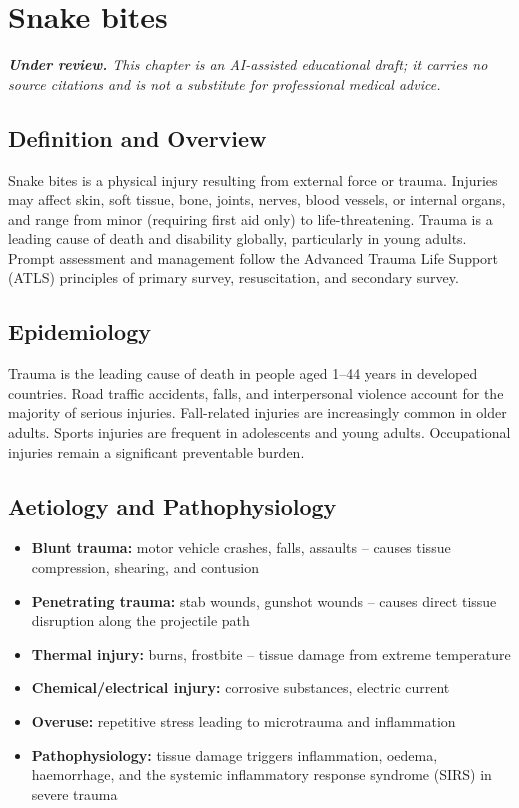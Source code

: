 \chapter{Snake bites}

\medskip
\noindent\textit{\textbf{Under review.} This chapter is an AI-assisted educational draft; it carries no source citations and is not a substitute for professional medical advice.}

\section*{Definition and Overview}
Snake bites is a physical injury resulting from external force or trauma. Injuries may affect skin, soft tissue, bone, joints, nerves, blood vessels, or internal organs, and range from minor (requiring first aid only) to life-threatening. Trauma is a leading cause of death and disability globally, particularly in young adults. Prompt assessment and management follow the Advanced Trauma Life Support (ATLS) principles of primary survey, resuscitation, and secondary survey.

\section*{Epidemiology}
Trauma is the leading cause of death in people aged 1--44 years in developed countries. Road traffic accidents, falls, and interpersonal violence account for the majority of serious injuries. Fall-related injuries are increasingly common in older adults. Sports injuries are frequent in adolescents and young adults. Occupational injuries remain a significant preventable burden.

\section*{Aetiology and Pathophysiology}
\begin{itemize}
    \item \textbf{Blunt trauma:} motor vehicle crashes, falls, assaults -- causes tissue compression, shearing, and contusion
    \item \textbf{Penetrating trauma:} stab wounds, gunshot wounds -- causes direct tissue disruption along the projectile path
    \item \textbf{Thermal injury:} burns, frostbite -- tissue damage from extreme temperature
    \item \textbf{Chemical/electrical injury:} corrosive substances, electric current
    \item \textbf{Overuse:} repetitive stress leading to microtrauma and inflammation
    \item \textbf{Pathophysiology:} tissue damage triggers inflammation, oedema, haemorrhage, and the systemic inflammatory response syndrome (SIRS) in severe trauma
\end{itemize}

